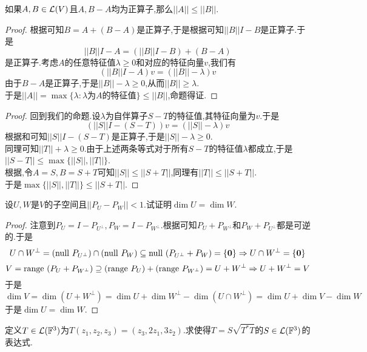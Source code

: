 \documentclass{ctexart}
\begin{document}
\begin{lemma}[Lemma.L.14]
    如果$A,B\in\mathcal{L}(V)$且$A,B-A$均为正算子,那么$||A||\leqslant||B||$.
\end{lemma}
\begin{proof}
    根据可知$B=A+(B-A)$是正算子,于是根据可知$||B||I-B$是正算子.于是
    \[||B||I-A=(||B||I-B)+(B-A)\]
    是正算子.考虑$A$的任意特征值$\lambda\geqslant0$和对应的特征向量$v$,我们有
    \[\left(||B||I-A\right)v=\left(||B||-\lambda\right)v\]
    由于$B-A$是正算子,于是$||B||-\lambda\geqslant0$,从而$||B||\geqslant\lambda$.\\
    于是$||A||=\max\{\lambda:\lambda\text{为}A\text{的特征值}\}\leqslant||B||$,命题得证.
\end{proof}
\begin{proof}
    回到我们的命题.设$\lambda$为自伴算子$S-T$的特征值,其特征向量为$v$.于是
    \[\left(||S||I-(S-T)\right)v=\left(||S||-\lambda\right)v\]
    根据和可知$||S||I-(S-T)$是正算子,于是$||S||-\lambda\geqslant0$.\\
    同理可知$||T||+\lambda\geqslant0$.由于上述两条等式对于所有$S-T$的特征值$\lambda$都成立,于是$||S-T||\leqslant\max\{||S||,||T||\}$.\\
    根据,令$A=S,B=S+T$可知$||S||\leqslant||S+T||$,同理有$||T||\leqslant||S+T||$.\\
    于是$\max\{||S||,||T||\}\leqslant||S+T||$.
\end{proof}
\begin{problem}[14.]
    设$U,W$是$V$的子空间且$||P_U-P_W||<1$.试证明$\dim U=\dim W$.
\end{problem}
\begin{proof}
    注意到$P_U=I-P_{U^\bot},P_W=I-P_{W^\bot}$.根据可知$P_U+P_{W^\bot}$和$P_W+P_{U^\bot}$都是可逆的.于是
    \[U\cap W^\bot=(\text{null } P_{U^{\bot}})\cap(\text{null } P_W)\subseteq\text{null }(P_{U^\bot}+P_W)=\{\mathbf0\}\Rightarrow U\cap W^\bot=\{\mathbf0\}\]
    \[V=\text{range }(P_U+P_{W^\bot})\supseteq(\text{range } P_U)+(\text{range } P_{W^\bot})=U+W^\bot\Rightarrow U+W^\bot=V\]
    于是
    \[\dim V=\dim(U+W^\bot)=\dim U+\dim W^\bot-\dim(U\cap W^\bot)=\dim U+\dim V-\dim W\]
    于是$\dim U=\dim W$.
\end{proof}
\begin{problem}[15.]
    定义$T\in\mathcal{L}(\mathbb{F}^3)$为$T(z_1,z_2,z_3)=(z_3,2z_1,3z_2)$.求使得$T=S\sqrt{T^*T}$的$S\in\mathcal{L}(\mathbb{F}^3)$的表达式.
\end{problem}
\end{document}
